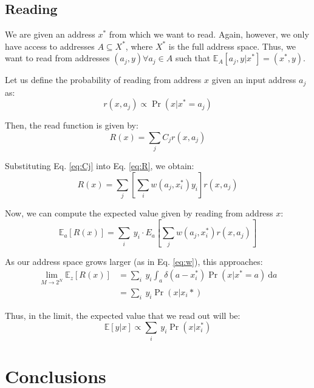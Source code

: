 \documentclass[10pt,letterpaper]{article}
\begin{document}
\subsection{Reading}

We are given an address $x^*$ from which we want to read. Again,
however, we only have access to addresses $A\subseteq X^*$, where
$X^*$ is the full address space. Thus, we want to read from addresses
$(a_j, y)\forall a_j\in A$ such that 
$\mathbb{E}_A[a_j,y|x^*]=(x^*,y)$.

Let us define the probability of reading from address $x$ given an
input address $a_j$ as:
\begin{equation}
r(x, a_j)\propto \Pr(x|x^*=a_j)
\label{eq:r}
\end{equation}

Then, the read function is given by:
\begin{equation}
R(x)=\sum_j C_j r(x, a_j)
\label{eq:R}
\end{equation}

Substituting Eq. \ref{eq:Cj} into Eq. \ref{eq:R}, we obtain:
\begin{equation}
R(x) = \sum_j\left[\sum_i w(a_j, x_i^*)y_i\right]r(x,a_j)
\end{equation}

Now, we can compute the expected value given by reading from address
$x$:
\begin{equation}
\mathbb{E}_a[R(x)]=\sum_i\ y_i\cdot E_a\left[\sum_j w(a_j, x_i^*)r(x,a_j)\right]
\end{equation}

As our address space grows larger (as in Eq. \ref{eq:w}), this approaches:
\begin{align}
\lim_{M\rightarrow 2^N} \mathbb{E}_z[R(x)]&=\sum_i\ y_i \int_a \delta(a-x_i^*)\Pr(x|x^*=a)\ \mathrm{d}a\\
&= \sum_i\ y_i\Pr(x|x_i*)
\end{align}

Thus, in the limit, the expected value that we read out will be:
\begin{equation}
\mathbb{E}[y|x]\propto \sum_i\ y_i\Pr(x|x_i^*)
\end{equation}


\section{Conclusions}
\end{document}
